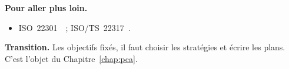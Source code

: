 \bigskip

\begin{boxinfo}
\textbf{Pour aller plus loin.}
\begin{itemize}
    \item ISO~22301~\cite{iso22301_2019}~; ISO/TS~22317~\cite{iso22317_2021}.
\end{itemize}
\end{boxinfo}

\begin{boxinfo}
\textbf{Transition.} Les objectifs fixés, il faut choisir les stratégies et
écrire les plans. C'est l'objet du Chapitre~\ref{chap:pca}.
\end{boxinfo}
